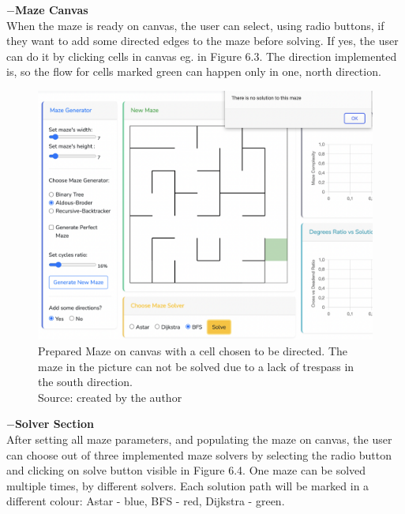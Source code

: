 \newline   
\textbf{$-$Maze Canvas}\\
When the maze is ready on canvas, the user can select, using radio buttons, if they want to add some directed edges to the maze before solving. If yes, the user can do it 
by clicking cells in canvas eg. in Figure 6.3. The direction implemented is, so the flow for cells marked green can happen only in one, north direction.\\
\begin{figure}[!h]
    \centering
    \includegraphics[width=0.5\linewidth]{mazeDirection}
    \caption{Prepared Maze on canvas with a cell chosen to be directed. The maze in the picture can not be solved due to a lack of trespass in the south direction.\\Source: created by the author}
    \end{figure}
\newpage
\textbf{$-$Solver Section}\\
After setting all maze parameters, and populating the maze on canvas, the user can choose out of three implemented maze solvers by selecting the radio button
and clicking on solve button visible in Figure 6.4. One maze can be solved multiple times, by different solvers. Each solution path will be marked in a different colour: 
Astar - blue, BFS - red, Dijkstra - green.\\
